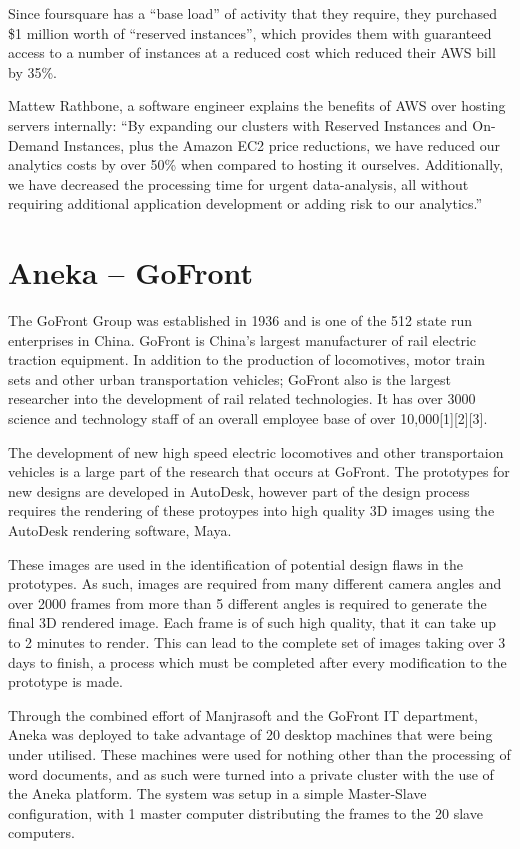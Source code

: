 Since foursquare has a ``base load'' of activity that they require, they purchased \$1 million worth of ``reserved instances'', which provides them with guaranteed access to a number of instances at a reduced cost which reduced their AWS bill by 35\%.  

Mattew Rathbone, a software engineer explains the benefits of AWS over hosting servers internally: ``By expanding our clusters with Reserved Instances and On-Demand Instances, plus the Amazon EC2 price reductions, we have reduced our analytics costs by over 50\% when compared to hosting it ourselves. Additionally, we have decreased the processing time for urgent data-analysis, all without requiring additional application development or adding risk to our analytics.''\ftSAmTwo
\ftSAmTwoText

\section{Aneka -- GoFront}

The GoFront Group was established in 1936 and is one of the 512 state run enterprises in China. 
GoFront is China's largest manufacturer of rail electric traction equipment. In addition to the production of locomotives, motor train sets and other urban transportation vehicles; GoFront also is the largest researcher into the development of rail related technologies. It has over 3000 science and technology staff of an overall employee base of over 10,000[1][2][3]. 

The development of new high speed electric locomotives and other transportaion vehicles is a large part of the research that occurs at GoFront. The prototypes for new designs are developed in AutoDesk, however part of the design process requires the rendering of these protoypes into high quality 3D images using the AutoDesk rendering software, Maya. 

These images are used in the identification of potential design flaws in the prototypes. As such, images are required from many different camera angles and over 2000 frames from more than 5 different angles is required to generate the final 3D rendered image. Each frame is of such high quality, that it can take up to 2 minutes to render. This can lead to the complete set of images taking over 3 days to finish, a process which must be completed after every modification to the prototype is made. 

Through the combined effort of Manjrasoft and the GoFront IT department, Aneka was deployed to take advantage of 20 desktop machines that were being under utilised. These machines were used for nothing other than the processing of word documents, and as such were turned into a private cluster with the use of the Aneka platform. The system was setup in a simple Master-Slave configuration, with 1 master computer distributing the frames to the 20 slave computers.

